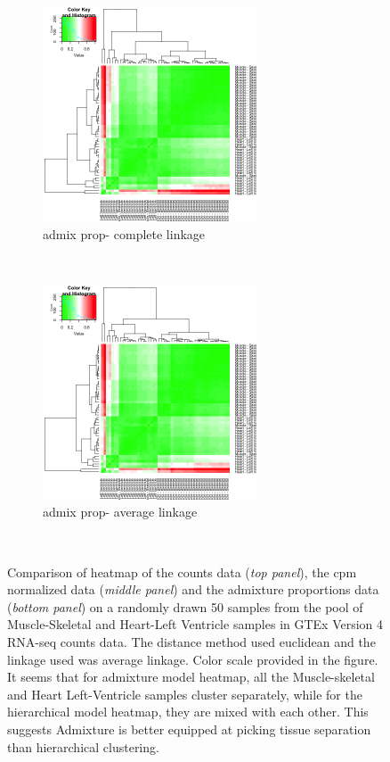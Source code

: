 \begin{figure}[ht]
     \begin{subfigure}[t]{0.5\textwidth}
        \centering
        \includegraphics[height=2.5in]{../plots/heart_muscle_admix_heatmap_complete.png}
        \caption{admix prop- complete linkage}
    \end{subfigure}%
    ~
    \begin{subfigure}[t]{0.5\textwidth}
        \centering
        \includegraphics[height=2.5in]{../plots/heart_muscle_admix_heatmap_average.png}
        \caption{admix prop- average linkage}
    \end{subfigure}\\

    \caption{Comparison of heatmap of the counts data (\textit{top panel}), the cpm normalized data (\textit{middle panel}) and the admixture proportions data (\textit{bottom panel}) on  a randomly drawn 50 samples from the pool of Muscle-Skeletal and Heart-Left Ventricle samples in GTEx Version 4 RNA-seq counts data. The distance method used euclidean and the linkage used was average linkage. Color scale provided in the figure. It seems that for admixture model heatmap, all the Muscle-skeletal and Heart Left-Ventricle samples cluster separately, while for the hierarchical model heatmap, they are mixed with each other. This suggests Admixture is better equipped at picking tissue separation than hierarchical clustering.}
\end{figure}


